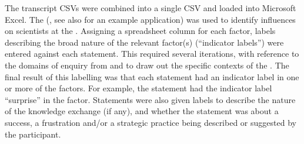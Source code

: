 The transcript CSVs were combined into a single CSV and loaded into Microsoft Excel. The \ISM{} (\cite{DarntonH2013}, see also \cite{MinamitaniDOI2024} for an example application) was used to identify influences on scientists at the \SPI. Assigning a spreadsheet column for each \ISM{} factor, labels describing the broad nature of the relevant factor(s) (``indicator labels'') were entered against each statement. This required several iterations, with reference to the domains of enquiry from \textcite{BuseMW2012} and \textcite{HaynesDCRHGS2011} to draw out the specific contexts of the \SPI. The final result of this labelling was that each statement had an indicator label in one or more of the \ISM{} factors. For example, the statement  had the indicator label ``surprise'' in the \ismie{} factor. Statements were also given labels to describe the nature of the knowledge exchange (if any), and whether the statement was about a success, a frustration and/or a strategic practice being described or suggested by the participant.




